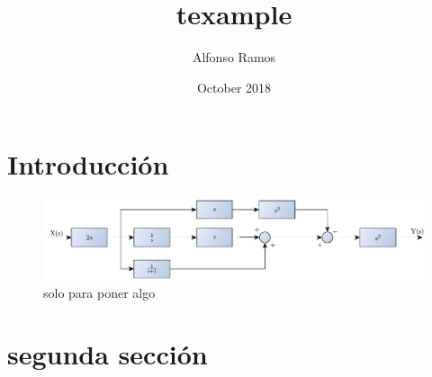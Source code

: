 \documentclass{article}
\title{texample}
\author{Alfonso Ramos}
\date{October 2018}
\begin{document}
\maketitle

\section{Introducción}
\lipsum[1-5]
\begin{figure}
	\centering
	\includegraphics[width=0.7\linewidth]{img/fig1}
	\caption{solo para poner algo}
	\label{fig:fig1}
\end{figure}
\section{segunda sección}
\lipsum[5-10]
\end{document}
